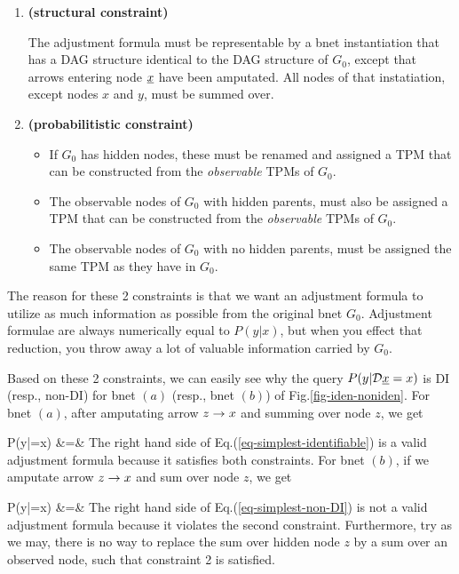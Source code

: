 \begin{enumerate}
\item {\bf(structural constraint)}

The adjustment formula must be
representable by a bnet instantiation 
that has a DAG structure identical
to the DAG structure of $G_0$,
except that arrows entering node
${\underline{x}}$ have been amputated.
All nodes  of that instatiation, except
nodes  $x$ and $y$,
must be summed over.

\item {\bf (probabilitistic constraint)}

\begin{itemize}
\item If $G_0$ has hidden nodes,
these must be renamed and 
assigned a TPM that
can be constructed 
from the {\it observable }
TPMs of $G_0$.
\item The observable
nodes of $G_0$ 
with hidden
parents, must also be assigned a TPM that
can be constructed 
from the {\it observable }
TPMs of $G_0$.
\item The observable
nodes of $G_0$ with no hidden
parents, must be assigned
the same TPM as they have in $G_0$.
\end{itemize}
\end{enumerate}
The reason for
these 2 constraints
is that we want
an adjustment
formula to utilize 
as much information
as possible
from the original bnet $G_0$.
Adjustment formulae are
always numerically equal to $P(y|x)$,
but when you
effect that reduction,
you throw
away a lot of
valuable information
carried by $G_0$.



Based on these 2 constraints,
we can easily see why the 
query $P(y|{\cal D}{\underline{x}}=x)$
is DI (resp., non-DI)
for bnet $(a)$ (resp., bnet $(b)$)
of Fig.\ref{fig-iden-noniden}.
For bnet $(a)$, after amputating arrow 
$z\rightarrow x$ and summing over node $z$,
we get 

\beqa
P(y|\cald\rvx=x)
&=&
\label{eq-simplest-identifiable}
\eeqa
The right hand
side of Eq.(\ref{eq-simplest-identifiable})
is a valid
adjustment formula
because it satisfies both constraints.
For bnet $(b)$,
if we amputate arrow 
$z\rightarrow x$ 
and sum over node $z$,
we get

\beqa
P(y|\cald \rvx =x)
&=&
\label{eq-simplest-non-DI}
\eeqa
The right hand
side of Eq.(\ref{eq-simplest-non-DI})
is not a valid
adjustment formula
because it violates the
second constraint. Furthermore,
try as we may,  there
is no way to replace the sum over
hidden  node $z$ by a sum over an observed node,
such that 
constraint 2 is satisfied.





